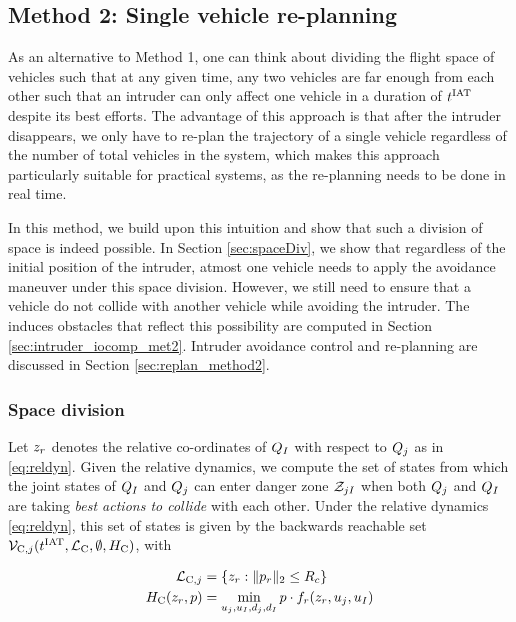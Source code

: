 \subsection{Method 2: Single vehicle re-planning \label{sec:intruder_method2}}
As an alternative to Method 1, one can think about dividing the flight space of vehicles such that at any given time, any two vehicles are far enough from each other such that an intruder can only affect one vehicle in a duration of $t^\text{IAT}$ despite its best efforts. The advantage of this approach is that after the intruder disappears, we only have to re-plan the trajectory of a single vehicle regardless of the number of total vehicles in the system, which makes this approach particularly suitable for practical systems, as the re-planning needs to be done in real time.

In this method, we build upon this intuition and show that such a division of space is indeed possible. In Section \ref{sec:spaceDiv}, we show that regardless of the initial position of the intruder, atmost one vehicle needs to apply the avoidance maneuver under this space division. However, we still need to ensure that a vehicle do not collide with another vehicle while avoiding the intruder. The induces obstacles that reflect this possibility are computed in Section \ref{sec:intruder_iocomp_met2}. Intruder avoidance control and re-planning are discussed in Section \ref{sec:replan_method2}.

\subsubsection{Space division \label{sec:spaceDiv}}
Let $z_r$ denotes the relative co-ordinates of $Q_{I}$ with respect to $Q_{j}$ as in \eqref{eq:reldyn}. Given the relative dynamics, we compute the set of states from which the joint states of $Q_{I}$ and $Q_{j}$ can enter danger zone $\mathcal{Z}_{jI}$ when both $Q_{j}$ and $Q_{I}$ are taking \textit{best actions to collide} with each other. Under the relative dynamics \eqref{eq:reldyn}, this set of states is given by the backwards reachable set $\mathcal{V}_{\text{C},j}(t^\text{IAT}, \mathcal{L}_\text{C}, \emptyset, H_\text{C})$, with

\begin{equation}
\begin{aligned}
\mathcal{L}_{\text{C},j} &= \{z_r: \|p_r\|_2 \le R_c\} \\
H_\text{C}(z_r, p) &= \min_{u_j, u_I, d_j, d_I} p \cdot f_r(z_r, u_j, u_I)
\end{aligned}
\end{equation}

